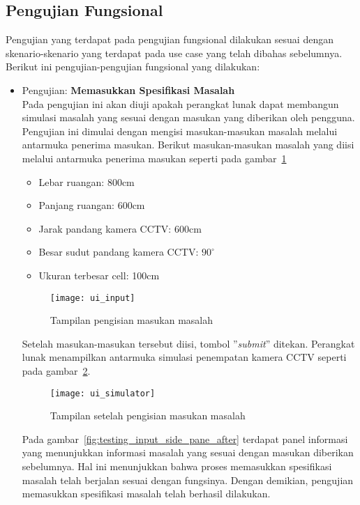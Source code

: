 \subsection{Pengujian Fungsional}
Pengujian yang terdapat pada pengujian fungsional dilakukan sesuai dengan skenario-skenario yang terdapat pada use case yang telah dibahas sebelumnya. Berikut ini pengujian-pengujian fungsional yang dilakukan:

\begin{itemize}
	\item Pengujian: \textbf{Memasukkan Spesifikasi Masalah}\\
	Pada pengujian ini akan diuji apakah perangkat lunak dapat membangun simulasi masalah yang sesuai dengan masukan yang diberikan oleh pengguna. Pengujian ini dimulai dengan mengisi masukan-masukan masalah melalui antarmuka penerima masukan. Berikut masukan-masukan masalah yang diisi melalui antarmuka penerima masukan seperti pada gambar~\ref{fig:testing_input_before}
	\begin{itemize}
		\item Lebar ruangan: 800cm
		\item Panjang ruangan: 600cm
		\item Jarak pandang kamera CCTV: 600cm
		\item Besar sudut pandang kamera CCTV: \(90^\circ\)
		\item Ukuran terbesar cell: 100cm
	\end{itemize}
	
	\begin{figure}[H]
		\centering  
		\texttt{[image: ui\_input]}
		\caption[Tampilan pengisian masukan masalah]{Tampilan pengisian masukan masalah}
		\label{fig:testing_input_before}
	\end{figure}
	
	Setelah masukan-masukan tersebut diisi, tombol ''\textit{submit}'' ditekan. Perangkat lunak menampilkan antarmuka simulasi penempatan kamera CCTV seperti pada gambar~\ref{fig:testing_input_after}. 
	
	\begin{figure}[H]
		\centering  
		\texttt{[image: ui\_simulator]}
		\caption[Tampilan setelah pengisian masukan masalah]{Tampilan setelah pengisian masukan masalah}
		\label{fig:testing_input_after}
	\end{figure}
	
	Pada gambar~\ref{fig:testing_input_side_pane_after} terdapat panel informasi yang menunjukkan informasi masalah yang sesuai dengan masukan diberikan sebelumnya. Hal ini menunjukkan bahwa proses memasukkan spesifikasi masalah telah berjalan sesuai dengan fungsinya. Dengan demikian, pengujian memasukkan spesifikasi masalah telah berhasil dilakukan.
	

\end{itemize}
